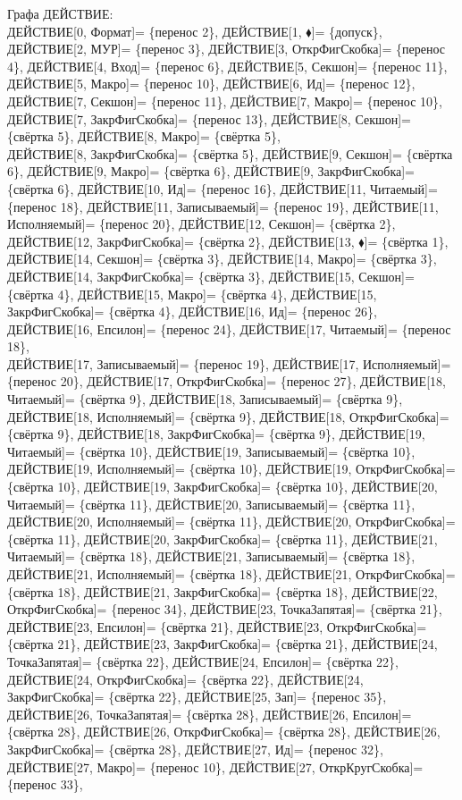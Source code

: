 \documentclass[a0]{a0poster}
\begin{document}
\tiny
Графа ДЕЙСТВИЕ:\\
ДЕЙСТВИЕ[0, Формат]= \{перенос 2\}, ДЕЙСТВИЕ[1, $\blacklozenge$]= \{допуск\}, ДЕЙСТВИЕ[2, МУР]= \{перенос 3\}, ДЕЙСТВИЕ[3, ОткрФигСкобка]= \{перенос 4\}, ДЕЙСТВИЕ[4, Вход]= \{перенос 6\}, ДЕЙСТВИЕ[5, Секшон]= \{перенос 11\}, ДЕЙСТВИЕ[5, Макро]= \{перенос 10\}, ДЕЙСТВИЕ[6, Ид]= \{перенос 12\}, ДЕЙСТВИЕ[7, Секшон]= \{перенос 11\}, ДЕЙСТВИЕ[7, Макро]= \{перенос 10\}, ДЕЙСТВИЕ[7, ЗакрФигСкобка]= \{перенос 13\}, ДЕЙСТВИЕ[8, Секшон]= \{свёртка 5\}, ДЕЙСТВИЕ[8, Макро]= \{свёртка 5\}, \\
ДЕЙСТВИЕ[8, ЗакрФигСкобка]= \{свёртка 5\}, ДЕЙСТВИЕ[9, Секшон]= \{свёртка 6\}, ДЕЙСТВИЕ[9, Макро]= \{свёртка 6\}, ДЕЙСТВИЕ[9, ЗакрФигСкобка]= \{свёртка 6\}, ДЕЙСТВИЕ[10, Ид]= \{перенос 16\}, ДЕЙСТВИЕ[11, Читаемый]= \{перенос 18\}, ДЕЙСТВИЕ[11, Записываемый]= \{перенос 19\}, ДЕЙСТВИЕ[11, Исполняемый]= \{перенос 20\}, ДЕЙСТВИЕ[12, Секшон]= \{свёртка 2\}, ДЕЙСТВИЕ[12, ЗакрФигСкобка]= \{свёртка 2\}, ДЕЙСТВИЕ[13, $\blacklozenge$]= \{свёртка 1\}, ДЕЙСТВИЕ[14, Секшон]= \{свёртка 3\}, ДЕЙСТВИЕ[14, Макро]= \{свёртка 3\}, ДЕЙСТВИЕ[14, ЗакрФигСкобка]= \{свёртка 3\}, ДЕЙСТВИЕ[15, Секшон]= \{свёртка 4\}, ДЕЙСТВИЕ[15, Макро]= \{свёртка 4\}, ДЕЙСТВИЕ[15, ЗакрФигСкобка]= \{свёртка 4\}, ДЕЙСТВИЕ[16, Ид]= \{перенос 26\}, ДЕЙСТВИЕ[16, Епсилон]= \{перенос 24\}, ДЕЙСТВИЕ[17, Читаемый]= \{перенос 18\}, \\
ДЕЙСТВИЕ[17, Записываемый]= \{перенос 19\}, ДЕЙСТВИЕ[17, Исполняемый]= \{перенос 20\}, ДЕЙСТВИЕ[17, ОткрФигСкобка]= \{перенос 27\}, ДЕЙСТВИЕ[18, Читаемый]= \{свёртка 9\}, ДЕЙСТВИЕ[18, Записываемый]= \{свёртка 9\}, ДЕЙСТВИЕ[18, Исполняемый]= \{свёртка 9\}, ДЕЙСТВИЕ[18, ОткрФигСкобка]= \{свёртка 9\}, ДЕЙСТВИЕ[18, ЗакрФигСкобка]= \{свёртка 9\}, ДЕЙСТВИЕ[19, Читаемый]= \{свёртка 10\}, ДЕЙСТВИЕ[19, Записываемый]= \{свёртка 10\}, ДЕЙСТВИЕ[19, Исполняемый]= \{свёртка 10\}, ДЕЙСТВИЕ[19, ОткрФигСкобка]= \{свёртка 10\}, ДЕЙСТВИЕ[19, ЗакрФигСкобка]= \{свёртка 10\}, ДЕЙСТВИЕ[20, Читаемый]= \{свёртка 11\}, ДЕЙСТВИЕ[20, Записываемый]= \{свёртка 11\}, ДЕЙСТВИЕ[20, Исполняемый]= \{свёртка 11\}, ДЕЙСТВИЕ[20, ОткрФигСкобка]= \{свёртка 11\}, ДЕЙСТВИЕ[20, ЗакрФигСкобка]= \{свёртка 11\}, ДЕЙСТВИЕ[21, Читаемый]= \{свёртка 18\}, ДЕЙСТВИЕ[21, Записываемый]= \{свёртка 18\}, \\
ДЕЙСТВИЕ[21, Исполняемый]= \{свёртка 18\}, ДЕЙСТВИЕ[21, ОткрФигСкобка]= \{свёртка 18\}, ДЕЙСТВИЕ[21, ЗакрФигСкобка]= \{свёртка 18\}, ДЕЙСТВИЕ[22, ОткрФигСкобка]= \{перенос 34\}, ДЕЙСТВИЕ[23, ТочкаЗапятая]= \{свёртка 21\}, ДЕЙСТВИЕ[23, Епсилон]= \{свёртка 21\}, ДЕЙСТВИЕ[23, ОткрФигСкобка]= \{свёртка 21\}, ДЕЙСТВИЕ[23, ЗакрФигСкобка]= \{свёртка 21\}, ДЕЙСТВИЕ[24, ТочкаЗапятая]= \{свёртка 22\}, ДЕЙСТВИЕ[24, Епсилон]= \{свёртка 22\}, ДЕЙСТВИЕ[24, ОткрФигСкобка]= \{свёртка 22\}, ДЕЙСТВИЕ[24, ЗакрФигСкобка]= \{свёртка 22\}, ДЕЙСТВИЕ[25, Зап]= \{перенос 35\}, ДЕЙСТВИЕ[26, ТочкаЗапятая]= \{свёртка 28\}, ДЕЙСТВИЕ[26, Епсилон]= \{свёртка 28\}, ДЕЙСТВИЕ[26, ОткрФигСкобка]= \{свёртка 28\}, ДЕЙСТВИЕ[26, ЗакрФигСкобка]= \{свёртка 28\}, ДЕЙСТВИЕ[27, Ид]= \{перенос 32\}, ДЕЙСТВИЕ[27, Макро]= \{перенос 10\}, ДЕЙСТВИЕ[27, ОткрКругСкобка]= \{перенос 33\}, \\
\end{document}
